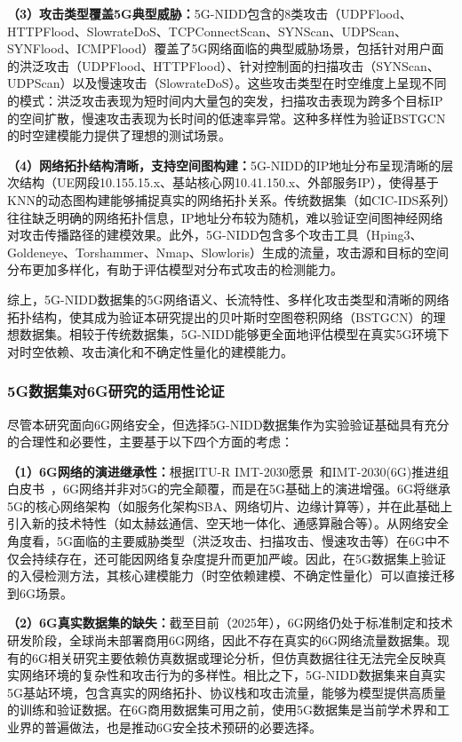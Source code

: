 \textbf{（3）攻击类型覆盖5G典型威胁：}5G-NIDD包含的8类攻击（UDPFlood、HTTPFlood、SlowrateDoS、TCPConnectScan、SYNScan、UDPScan、SYNFlood、ICMPFlood）覆盖了5G网络面临的典型威胁场景，包括针对用户面的洪泛攻击（UDPFlood、HTTPFlood）、针对控制面的扫描攻击（SYNScan、UDPScan）以及慢速攻击（SlowrateDoS）。这些攻击类型在时空维度上呈现不同的模式：洪泛攻击表现为短时间内大量包的突发，扫描攻击表现为跨多个目标IP的空间扩散，慢速攻击表现为长时间的低速率异常。这种多样性为验证BSTGCN的时空建模能力提供了理想的测试场景。

\textbf{（4）网络拓扑结构清晰，支持空间图构建：}5G-NIDD的IP地址分布呈现清晰的层次结构（UE网段10.155.15.x、基站核心网10.41.150.x、外部服务IP），使得基于KNN的动态图构建能够捕捉真实的网络拓扑关系。传统数据集（如CIC-IDS系列）往往缺乏明确的网络拓扑信息，IP地址分布较为随机，难以验证空间图神经网络对攻击传播路径的建模效果。此外，5G-NIDD包含多个攻击工具（Hping3、Goldeneye、Torshammer、Nmap、Slowloris）生成的流量，攻击源和目标的空间分布更加多样化，有助于评估模型对分布式攻击的检测能力。

综上，5G-NIDD数据集的5G网络语义、长流特性、多样化攻击类型和清晰的网络拓扑结构，使其成为验证本研究提出的贝叶斯时空图卷积网络（BSTGCN）的理想数据集。相较于传统数据集，5G-NIDD能够更全面地评估模型在真实5G环境下对时空依赖、攻击演化和不确定性量化的建模能力。

\subsubsection{5G数据集对6G研究的适用性论证}

尽管本研究面向6G网络安全，但选择5G-NIDD数据集作为实验验证基础具有充分的合理性和必要性，主要基于以下四个方面的考虑：

\textbf{（1）6G网络的演进继承性：}根据ITU-R IMT-2030愿景~\cite{ITU_IMT2030_2023}和IMT-2030(6G)推进组白皮书~\cite{IMT2030_6G_WhitePaper_2021}，6G网络并非对5G的完全颠覆，而是在5G基础上的演进增强。6G将继承5G的核心网络架构（如服务化架构SBA、网络切片、边缘计算等），并在此基础上引入新的技术特性（如太赫兹通信、空天地一体化、通感算融合等）。从网络安全角度看，5G面临的主要威胁类型（洪泛攻击、扫描攻击、慢速攻击等）在6G中不仅会持续存在，还可能因网络复杂度提升而更加严峻。因此，在5G数据集上验证的入侵检测方法，其核心建模能力（时空依赖建模、不确定性量化）可以直接迁移到6G场景。

\textbf{（2）6G真实数据集的缺失：}截至目前（2025年），6G网络仍处于标准制定和技术研发阶段，全球尚未部署商用6G网络，因此不存在真实的6G网络流量数据集。现有的6G相关研究主要依赖仿真数据或理论分析，但仿真数据往往无法完全反映真实网络环境的复杂性和攻击行为的多样性。相比之下，5G-NIDD数据集来自真实5G基站环境，包含真实的网络拓扑、协议栈和攻击流量，能够为模型提供高质量的训练和验证数据。在6G商用数据集可用之前，使用5G数据集是当前学术界和工业界的普遍做法，也是推动6G安全技术预研的必要选择。

